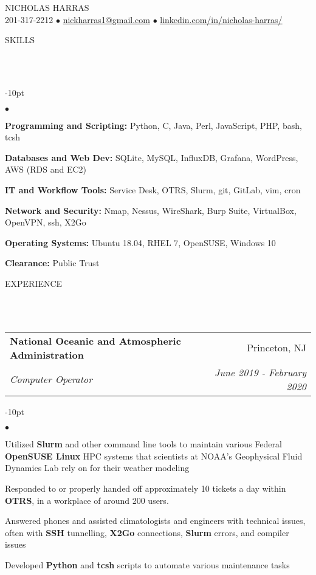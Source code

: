 \documentclass[12pt]{article}
\makeatletter
\newcommand{\mailto}[1]{
	\href{mailto:#1}{#1}
}
\newcommand{\contact}[2]{
	\vspace*{-8pt}
	\begin{center}
		{#1}\\ %
		#2
	\end{center}
	\vspace*{-12pt}
}
\newcommand{\header}[1]{
	\vspace*{12pt} %
	{\hspace*{-14pt}\vspace*{6pt} #1}
	\vspace*{-6pt} 
	\lineunder
}
\newcommand{\lineunder}{
	\vspace*{-8pt} \\ 
	\hspace*{-18pt} 
	\hrulefill \\
}
\newcommand{\subheading}[4]{
 	\vspace{5pt}
    	\begin{tabular*}{1.01\textwidth}
    		{l@{\extracolsep{\fill}}r}
      		\hspace{-16pt}\textbf{#1} & #2 \\
      		\hspace{-16pt}\textit{\small#3} & \textit{\small #4} \\
    	\end{tabular*}
    \vspace{-4pt}
}
\newenvironment{achievements}{
\begin{adjustwidth}{-10pt}{}
  \begin{list}{$\bullet$}{
  	\topsep 0pt \itemsep -4pt}}
  	{\vspace*{2pt}\end{list}
\end{adjustwidth}
}
\makeatother
\begin{document}
\small
\smallskip
\vspace*{-40pt}

\contact{\huge{N}\LARGE{ICHOLAS} \huge{H}\LARGE{ARRAS}}{201-317-2212 $\bullet$ \mailto{nickharras1@gmail.com} $\bullet$ \href{https://www.github.com/harras}{linkedin.com/in/nicholas-harras/}}

\vspace{-8pt}
\header{SKILLS}
	\begin{achievements}
		\item{\bf Programming and Scripting:} Python, C, Java, Perl, JavaScript, PHP, bash, tcsh
		\item{\bf Databases and Web Dev:} SQLite, MySQL, InfluxDB, Grafana, WordPress, AWS (RDS and EC2)
		\item{\bf IT and Workflow Tools:} Service Desk, OTRS, Slurm, git, GitLab, vim, cron 
		\item{\bf Network and Security:} Nmap, Nessus, WireShark, Burp Suite, VirtualBox, OpenVPN, ssh, X2Go
		\item{\bf Operating Systems:} Ubuntu 18.04, RHEL 7, OpenSUSE, Windows 10
		\item{\bf Clearance:} Public Trust
	\end{achievements}

\vspace{-8pt}
\header{EXPERIENCE}

\subheading
	{National Oceanic and Atmospheric Administration}{Princeton, NJ}
	{Computer Operator}{June 2019 - February 2020}
	\begin{achievements}
		\item Utilized \textbf{Slurm} and other command line tools to maintain various Federal \textbf{OpenSUSE Linux} HPC systems that scientists at NOAA's Geophysical Fluid Dynamics Lab rely on for their weather modeling
		\item Responded to or properly handed off approximately 10 tickets a day within \textbf{OTRS}, in a workplace of around 200 users.	
		\item Answered phones and assisted climatologists and engineers with technical issues, often with \textbf{SSH} tunnelling, \textbf{X2Go} connections, \textbf{Slurm} errors, and compiler issues
		\item Developed \textbf{Python} and \textbf{tcsh} scripts to automate various maintenance tasks
		
		
	\end{achievements}
	
\end{document}

